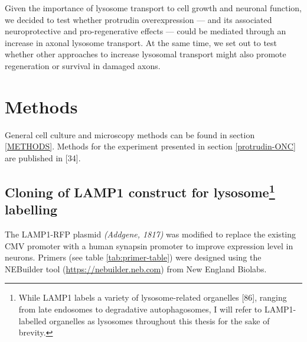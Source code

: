 \documentclass[
  12pt,
  a4paper,
]{book}
\begin{document}
Given the importance of lysosome transport to cell growth and neuronal function, we decided to test whether protrudin overexpression --- and its associated neuroprotective and pro-regenerative effects --- could be mediated through an increase in axonal lysosome transport. At the same time, we set out to test whether other approaches to increase lysosomal transport might also promote regeneration or survival in damaged axons.

\hypertarget{methods}{%
\section{Methods}\label{methods}}

General cell culture and microscopy methods can be found in section \ref{METHODS}. Methods for the experiment presented in section \ref{protrudin-ONC} are published in {[}34{]}.

\hypertarget{cloning}{%
\subsection[Cloning of LAMP1 construct for lysosome labelling]{\texorpdfstring{Cloning of LAMP1 construct for lysosome\footnote{While LAMP1 labels a variety of lysosome-related organelles {[}86{]}, ranging from late endosomes to degradative autophagosomes, I will refer to LAMP1-labelled organelles as lysosomes throughout this thesis for the sake of brevity.} labelling}{Cloning of LAMP1 construct for lysosome labelling}}\label{cloning}}

The LAMP1-RFP plasmid \emph{(Addgene, 1817)} was modified to replace the existing CMV promoter with a human synapsin promoter to improve expression level in neurons. Primers (see table \ref{tab:primer-table}) were designed using the NEBuilder tool (\url{https://nebuilder.neb.com}) from New England Biolabs.

\begin{table}

\caption{\label{tab:primer-table}Gibson cloning primers.}
\centering
{}
\end{table}
\end{document}
